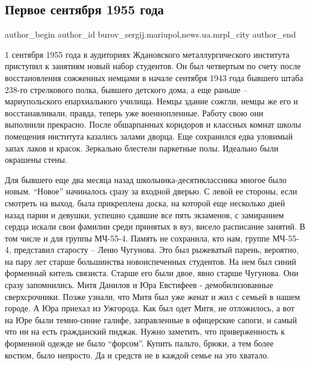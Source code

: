  
 
 
 
 
 
\subsection{Первое сентября 1955 года}
\label{sec:01_09_2018.stz.news.ua.mrpl_city.1.pervoje_sentjabrja_1955_goda}
 
\ifcmt
 author_begin
   author_id burov_sergij.mariupol,news.ua.mrpl_city
 author_end
\fi


1 сентября 1955 года в аудиториях Ждановского металлургического института
приступил к занятиям новый набор студентов. Он был четвертым по счету после
восстановления сожженных немцами в начале сентября 1943 года бывшего штаба
238-го стрелкового полка, бывшего детского дома, а еще раньше – мариупольского
епархиального училища. Немцы здание сожгли, немцы же его и восстанавливали,
правда, теперь уже военнопленные. Работу свою они выполнили прекрасно. После
обшарпанных коридоров и классных комнат школы помещения института казались
залами дворца. Еще сохранился едва уловимый запах лаков и красок. Зеркально
блестели паркетные полы. Идеально были окрашены стены.

Для бывшего еще два месяца назад школьника-десятиклассника многое было новым.
\enquote{Новое} начиналось сразу за входной дверью. С левой ее стороны, если смотреть
на выход, была прикреплена доска, на которой еще несколько дней назад парни и
девушки, успешно сдавшие все пять экзаменов, с замиранием сердца искали свои
фамилии среди принятых в вуз, висело расписание занятий. В том числе и для
группы МЧ-55-4. Память не сохранила, кто нам, группе МЧ-55-4, представил
старосту – Леню Чугунова. Это был рыжеватый парень, вероятно, на пару лет
старше большинства новоиспеченных студентов. На нем был синий форменный китель
связиста. Старше его были двое, явно старше Чугунова. Они сразу запомнились.
Митя Данилов и Юра Евстифеев - демобилизованные сверхсрочники. Позже узнали,
что Митя был уже женат и жил с семьей в нашем городе. А Юра приехал из
Ужгорода. Как был одет Митя, не отложилось, а вот на Юре были темно-синие
галифе, заправленные в офицерские сапоги, и самый что ни на есть гражданский
пиджак. Нужно заметить, что приверженность к форменной одежде не было \enquote{форсом}.
Купить пальто, брюки, а тем более костюм, было непросто. Да и средств не в
каждой семье на это хватало.

